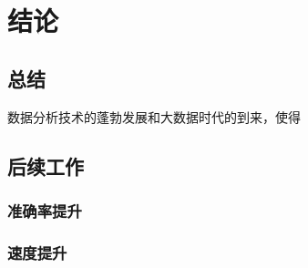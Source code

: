 \chapter{结论}
\label{chap:conclusion}
\section*{总结}
数据分析技术的蓬勃发展和大数据时代的到来，使得
\section*{后续工作}
\subsection*{准确率提升}
\subsection*{速度提升}
